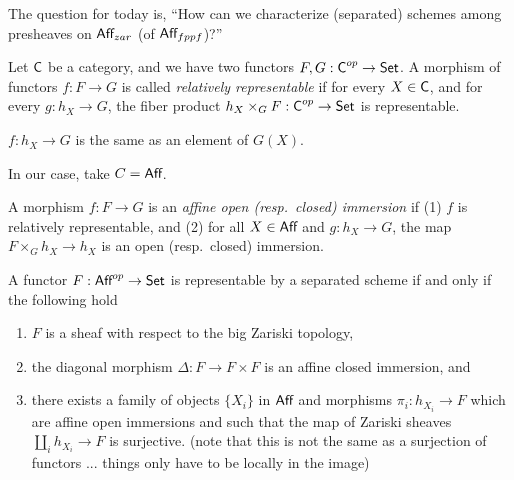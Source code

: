 
The question for today is, ``How can we characterize (separated) schemes among presheaves on $\text{\sf Aff}_{zar}$ (of $\text{\sf Aff}_{fppf}$)?''

\begin{definition}
 Let $\text{\sf C}$ be a category, and we have two functors $F,G:\text{\sf C}^{op}\to \text{\sf Set}$. A morphism of functors $f:F\to G$ is called \emph{relatively representable} if for every $X\in \text{\sf C}$, and for every $g:h_X\to G$, the fiber product $h_X\times_G F:\text{\sf C}^{op}\to \text{\sf Set}$ is representable.
\end{definition}
\begin{remark}
  $f:h_X\to G$ is the same as an element of $G(X)$.
\end{remark}
In our case, take $C=\text{\sf Aff}$.
\begin{definition}
  A morphism $f:F\to G$ is an \emph{affine open (resp.~closed) immersion} if
  (1) $f$ is relatively representable, and (2) for all $X\in \text{\sf Aff}$ and $g:h_X\to
  G$, the map $F\times_G h_X\to h_X$ is an open (resp.~closed) immersion.
\end{definition}
\begin{proposition}
  A functor $F:\text{\sf Aff}^{op}\to \text{\sf Set}$ is representable by a separated scheme if and
  only if the following hold
  \begin{enumerate}
    \item $F$ is a sheaf with respect to the big Zariski topology,
    \item the diagonal morphism $\Delta:F\to F\times F$ is an affine closed immersion,
    and
    \item there exists a family of objects $\{X_i\}$ in $\text{\sf Aff}$ and morphisms
    $\pi_i:h_{X_i}\to F$ which are affine open immersions and such that the map of Zariski
    sheaves $\coprod_i h_{X_i} \to F$ is surjective. (note that this is not the same as
    a surjection of functors ... things only have to be locally in the image)
  \end{enumerate}
\end{proposition}
